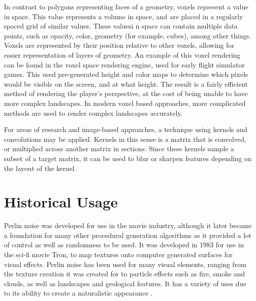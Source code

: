 \documentclass[10pt]{report}
\begin{document}
		In contrast to polygons representing faces of a geometry, voxels represent a value in space. This value represents a volume in space, and are placed in a regularly spaced grid of similar values. These valuesi n space can contain multiple data points, such as opacity, color, geometry (for example, cubes), among other things. Voxels are represented by their position relative to other voxels, allowing for easier representation of layers of geometry. An example of this voxel rendering can be found in the voxel space rendering engine, used for early flight simulator games. This used pre-generated height and color maps to determine which pixels would be visible on the screen, and at what height. The result is a fairly efficient method of rendering the player's perspective, at the cost of being unable to have more complex landscapes. In modern voxel based approaches, more complicated methods are used to render complex landscapes accurately.
		
		For areas of research and image-based approaches, a technique using kernels and convolutions may be applied. Kernels in this sense is a matrix that is convolved, or multiplied across another matrix in sections. Since these kernels sample a subset of a target matrix, it can be used to blur or sharpen features depending on the layout of the kernel. 
		
	\vspace{10pt}
	\let\clearpage\relax
	\chapter{Historical Usage}
		
		Perlin noise was developed for use in the movie industry, although it later became a foundation for many other procedural generation algorithms as it provided a lot of control as well as randomness to be used. It was developed in 1983 for use in the sci-fi movie Tron, to map textures onto computer generated surfaces for visual effects. Perlin noise has been used for many visual elements, ranging from the texture creation it was created for to particle effects such as fire, smoke and clouds, as well as landscapes and geological features. It has a variety of uses due to its ability to create a naturalistic appearance \cite{10.1145/325165.325247}.
\end{document}
